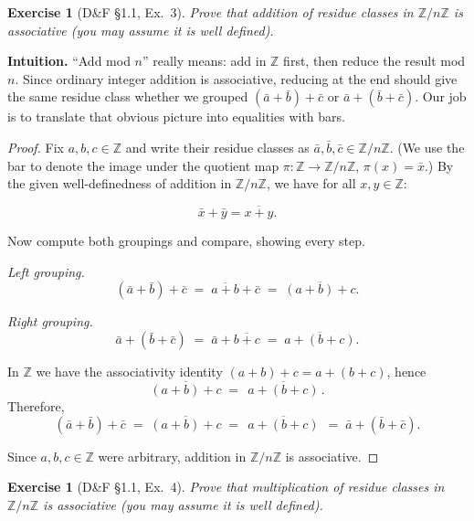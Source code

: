 \documentclass[12pt]{article}
\newtheorem{exercise}[theorem]{Exercise}
\theoremstyle{definition}
\begin{document}
\newpage

\begin{exercise}[D\&F §1.1, Ex.~3]
Prove that addition of residue classes in $\mathbb{Z}/n\mathbb{Z}$ is associative (you may assume it is well defined).
\end{exercise}

\dotfill

\noindent
\textbf{Intuition.}
“Add mod $n$” really means: add in $\mathbb{Z}$ first, then reduce the result mod $n$. Since ordinary integer addition is associative, reducing at the end should give the same residue class whether we grouped $(\bar a+\bar b)+\bar c$ or $\bar a+(\bar b+\bar c)$. Our job is to translate that obvious picture into equalities with bars.

\dotfill

\begin{proof}
Fix $a,b,c\in\mathbb{Z}$ and write their residue classes as $\bar a,\bar b,\bar c\in\mathbb{Z}/n\mathbb{Z}$. (We use the bar to denote the image under the quotient map $\pi:\mathbb{Z}\to\mathbb{Z}/n\mathbb{Z}$, $\pi(x)=\bar x$.) By the given well-definedness of addition in $\mathbb{Z}/n\mathbb{Z}$, we have for all $x,y\in\mathbb{Z}$:

\[
\bar x+\bar y=\overline{x+y}.
\]

Now compute both groupings and compare, showing every step.

\dotfill

\noindent\emph{Left grouping.}
\[
(\bar a+\bar b)+\bar c
\;=\; \overline{a+b}+\bar c
\;=\; \overline{(a+b)+c}.
\]

\noindent\emph{Right grouping.}
\[
\bar a+(\bar b+\bar c)
\;=\; \bar a+\overline{b+c}
\;=\; \overline{a+(b+c)}.
\]

In $\mathbb{Z}$ we have the associativity identity $(a+b)+c=a+(b+c)$, hence
\[
\overline{(a+b)+c} \;=\; \overline{\,a+(b+c)\,}.
\]
Therefore,
\[
(\bar a+\bar b)+\bar c
\;=\; \overline{(a+b)+c}
\;=\; \overline{\,a+(b+c)\,}
\;=\; \bar a+(\bar b+\bar c).
\]

Since $a,b,c\in\mathbb{Z}$ were arbitrary, addition in $\mathbb{Z}/n\mathbb{Z}$ is associative.
\end{proof}

\newpage

\begin{exercise}[D\&F §1.1, Ex.~4]
Prove that multiplication of residue classes in $\mathbb{Z}/n\mathbb{Z}$ is associative (you may assume it is well defined).
\end{exercise}
\end{document}
